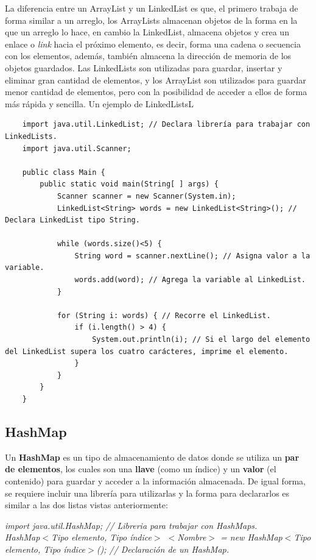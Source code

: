 La diferencia entre un ArrayList y un LinkedList es que, el primero trabaja de forma similar a un arreglo, los ArrayLists almacenan objetos de la forma en la que un arreglo lo hace, en cambio la LinkedList, almacena objetos y crea un enlace o \textit{link} hacia el próximo elemento, es decir, forma una cadena o secuencia con los elementos, además, también almacena la dirección de memoria de los objetos guardados. Las LinkedLists son utilizadas para guardar, insertar y eliminar gran cantidad de elementos, y los ArrayList son utilizados para guardar menor cantidad de elementos, pero con la posibilidad de acceder a ellos de forma más rápida y sencilla. Un ejemplo de LinkedListsL
\begin{lstlisting}
    import java.util.LinkedList; // Declara librería para trabajar con LinkedLists.
    import java.util.Scanner;

    public class Main {
        public static void main(String[ ] args) {
	        Scanner scanner = new Scanner(System.in);
            LinkedList<String> words = new LinkedList<String>(); // Declara LinkedList tipo String.
        
            while (words.size()<5) {
                String word = scanner.nextLine(); // Asigna valor a la variable.
                words.add(word); // Agrega la variable al LinkedList.
            }
        
            for (String i: words) { // Recorre el LinkedList.
                if (i.length() > 4) {
                    System.out.println(i); // Si el largo del elemento del LinkedList supera los cuatro carácteres, imprime el elemento.
                }
            }
        }
    }
\end{lstlisting}


\subsection{HashMap}
\hspace{0.55cm}Un \textbf{HashMap} es un tipo de almacenamiento de datos donde se utiliza un \textbf{par de elementos}, los cuales son una \textbf{llave} (como un índice) y un \textbf{valor} (el contenido) para guardar y acceder a la información almacenada. De igual forma, se requiere incluir una librería para utilizarlas y la forma para declararlos es similar a las dos listas vistas anteriormente:
\begin{center}
	\textit{
		import java.util.HashMap; // Libreria para trabajar con HashMaps. \\
		HashMap$<$Tipo elemento, Tipo índice$>$ $<$Nombre$>$ = new HashMap$<$Tipo elemento, Tipo índice$>$(); // Declaración de un HashMap.
	}
\end{center}

